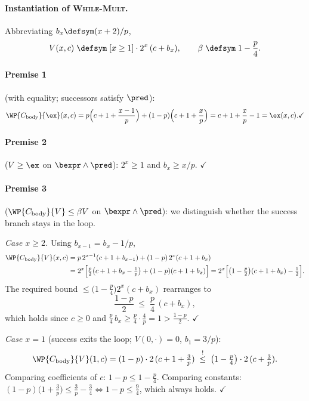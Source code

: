 \paragraph{Instantiation of \textsc{While-Mult}.}
Abbreviating $b_x \defsym (x+2)/p$,
\[
  V(x,c) \;\defsym\; [x \geq 1]\cdot 2^{x}\,(c + b_x),
  \qquad
  \beta \;\defsym\; 1 - \frac{p}{4}.
\]

\paragraph{Premise 1} (with equality; successors satisfy $\pred$):
\[
  \WP{C_{\text{body}}}{\ex}(x,c)
  = p\Bigl(c+1+\frac{x-1}{p}\Bigr) + (1-p)\Bigl(c+1+\frac{x}{p}\Bigr)
  = c + 1 + \frac{x}{p} - 1
  = \ex(x,c).
  \checkmark
\]

\paragraph{Premise 2} ($V \geq \ex$ on $\bexpr\land\pred$):
$2^x \geq 1$ and $b_x \geq x/p$. $\checkmark$

\paragraph{Premise 3} ($\WP{C_{\text{body}}}{V} \leq \beta V$ on
$\bexpr\land\pred$): we distinguish whether the success branch stays in the
loop.

\emph{Case $x \geq 2$.} Using $b_{x-1} = b_x - 1/p$,
\begin{align*}
  \WP{C_{\text{body}}}{V}(x,c)
  &= p\,2^{x-1}(c+1+b_{x-1}) + (1-p)\,2^{x}(c+1+b_x) \\
  &= 2^{x}\Bigl[\tfrac{p}{2}\bigl(c+1+b_x - \tfrac1p\bigr)
       + (1-p)(c+1+b_x)\Bigr]
   = 2^{x}\Bigl[\bigl(1-\tfrac{p}{2}\bigr)(c+1+b_x) - \tfrac12\Bigr].
\end{align*}
The required bound $\leq \bigl(1-\tfrac{p}{4}\bigr)2^x(c+b_x)$ rearranges to
\[
  \frac{1-p}{2} \;\leq\; \frac{p}{4}\,(c + b_x),
\]
which holds since $c \geq 0$ and $\tfrac{p}{4}\, b_x \geq \tfrac{p}{4}\cdot
\tfrac{4}{p} = 1 > \tfrac{1-p}{2}$. $\checkmark$

\emph{Case $x = 1$} (success exits the loop; $V(0,\cdot) = 0$, $b_1 = 3/p$):
\[
  \WP{C_{\text{body}}}{V}(1,c)
  = (1-p)\cdot 2\,(c+1+\tfrac{3}{p})
  \;\overset{!}{\leq}\;
  \bigl(1-\tfrac{p}{4}\bigr)\cdot 2\,(c+\tfrac{3}{p}).
\]
Comparing coefficients of $c$: $1-p \leq 1-\tfrac{p}{4}$. Comparing
constants:
$(1-p)\bigl(1+\tfrac{3}{p}\bigr) \leq \tfrac{3}{p} - \tfrac{3}{4}
 \iff 1-p \leq \tfrac{9}{4}$,
which always holds. $\checkmark$


